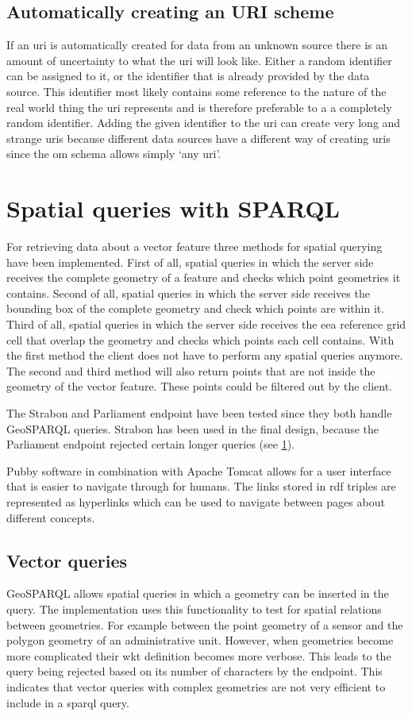 \subsection{Automatically creating an URI scheme}
If an \ac{uri} is automatically created for data from an unknown source there is an amount of uncertainty to what the \ac{uri} will look like. Either a random identifier can be assigned to it, or the identifier that is already provided by the data source. This identifier most likely contains some reference to the nature of the real world thing the \ac{uri} represents and is therefore preferable to a a completely random identifier. Adding the given identifier to the \ac{uri} can create very long and strange \acp{uri} because different data sources have a different way of creating \acp{uri} since the \ac{om} schema allows simply `any \ac{uri}'.   

\section{Spatial queries with SPARQL}
\label{par:spQueries}
For retrieving data about a vector feature three methods for spatial querying have been implemented. First of all, spatial queries in which the server side receives the complete geometry of a feature and checks which point geometries it contains. Second of all, spatial queries in which the server side receives the bounding box of the complete geometry and check which points are within it. Third of all, spatial queries in which the server side receives the \ac{eea} reference grid cell that overlap the geometry and checks which points each cell contains. With the first method the client does not have to perform any spatial queries anymore. The second and third method will also return points that are not inside the geometry of the vector feature. These points could be filtered out by the client. 

The Strabon and Parliament endpoint have been tested since they both handle GeoSPARQL queries. Strabon has been used in the final design, because the Parliament endpoint rejected certain longer queries (see \ref{par:spQueries}).

Pubby software in combination with Apache Tomcat allows for a user interface that is easier to navigate through for humans. The links stored in \ac{rdf} triples are represented as hyperlinks which can be used to navigate between pages about different concepts. 

\subsection{Vector queries}
GeoSPARQL allows spatial queries in which a geometry can be inserted in the query. The implementation uses this functionality to test for spatial relations between geometries. For example between the point geometry of a sensor and the polygon geometry of an administrative unit. However, when geometries become more complicated their \ac{wkt} definition becomes more verbose. This leads to the query being rejected based on its number of characters by the endpoint. This indicates that vector queries with complex geometries are not very efficient to include in a \ac{sparql} query.     


